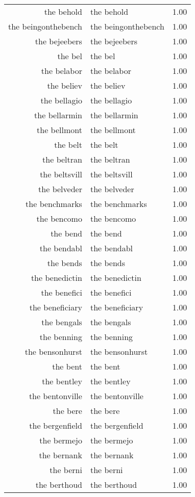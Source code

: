 \begin{table}[ht]
\begin{tabular}{rlr}
  the behold & the behold & 1.00 \\ 
  the beingonthebench & the beingonthebench & 1.00 \\ 
  the bejeebers & the bejeebers & 1.00 \\ 
  the bel & the bel & 1.00 \\ 
  the belabor & the belabor & 1.00 \\ 
  the believ & the believ & 1.00 \\ 
  the bellagio & the bellagio & 1.00 \\ 
  the bellarmin & the bellarmin & 1.00 \\ 
  the bellmont & the bellmont & 1.00 \\ 
  the belt & the belt & 1.00 \\ 
  the beltran & the beltran & 1.00 \\ 
  the beltsvill & the beltsvill & 1.00 \\ 
  the belveder & the belveder & 1.00 \\ 
  the benchmarks & the benchmarks & 1.00 \\ 
  the bencomo & the bencomo & 1.00 \\ 
  the bend & the bend & 1.00 \\ 
  the bendabl & the bendabl & 1.00 \\ 
  the bends & the bends & 1.00 \\ 
  the benedictin & the benedictin & 1.00 \\ 
  the benefici & the benefici & 1.00 \\ 
  the beneficiary & the beneficiary & 1.00 \\ 
  the bengals & the bengals & 1.00 \\ 
  the benning & the benning & 1.00 \\ 
  the bensonhurst & the bensonhurst & 1.00 \\ 
  the bent & the bent & 1.00 \\ 
  the bentley & the bentley & 1.00 \\ 
  the bentonville & the bentonville & 1.00 \\ 
  the bere & the bere & 1.00 \\ 
  the bergenfield & the bergenfield & 1.00 \\ 
  the bermejo & the bermejo & 1.00 \\ 
  the bernank & the bernank & 1.00 \\ 
  the berni & the berni & 1.00 \\ 
  the berthoud & the berthoud & 1.00 \\ 

\end{tabular}
\end{table}
